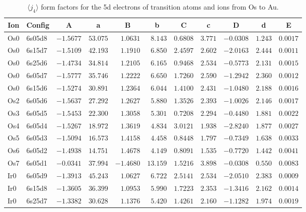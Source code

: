 \begin{table}[H]
 \caption{$\langle j_4\rangle$ form factors for the 5d electrons of transition atoms and ions from Os to Au.\cite{kob:11}}
\label{5dj4b} \vspace{1ex}
{\tablesize
\begin{tabular}{llrrrrrrrrr}
\hline
\multicolumn{1}{c}{ Ion}&\multicolumn{1}{c}{ Config}&\multicolumn{1}{c}{ A }&\multicolumn{1}{c}{  a }&\multicolumn{1}{c}{B }&\multicolumn{1}{c}{ b }&\multicolumn{1}{c}{ C }&\multicolumn{1}{c}{ c }&\multicolumn{1}{c}{ D }&\multicolumn{1}{c}{ d }&\multicolumn{1}{c}{E }\\
\hline
Os0 & 6s05d8 &$-1.5677$ &$53.075$ &$1.0631$ &$8.143$ &$0.6808$ &$3.771$ &$-0.0308$ &$1.243$ &$0.0017$ \\
Os0 & 6s15d7 &$-1.5109$ &$42.193$ &$1.1910$ &$6.850$ &$2.4597$ &$2.602$ &$-2.0163$ &$2.444$ &$0.0011$ \\
Os0 & 6s25d6 &$-1.4734$ &$34.814$ &$1.2105$ &$6.165$ &$0.9468$ &$2.534$ &$-0.5773$ &$2.131$ &$0.0015$ \\
Os0 & 6s05d7 &$-1.5777$ &$35.746$ &$1.2222$ &$6.650$ &$1.7260$ &$2.590$ &$-1.2942$ &$2.360$ &$0.0012$ \\
Os0 & 6s15d6 &$-1.5274$ &$30.891$ &$1.2364$ &$6.044$ &$1.4100$ &$2.431$ &$-1.0480$ &$2.188$ &$0.0016$ \\
Os2 & 6s05d6 &$-1.5637$ &$27.292$ &$1.2627$ &$5.880$ &$1.3526$ &$2.393$ &$-1.0026$ &$2.146$ &$0.0017$ \\
Os3 & 6s05d5 &$-1.5453$ &$22.300$ &$1.3058$ &$5.301$ &$0.7208$ &$2.294$ &$-0.4480$ &$1.881$ &$0.0022$ \\
Os4 & 6s05d4 &$-1.5267$ &$18.972$ &$1.3619$ &$4.834$ &$3.0121$ &$1.938$ &$-2.8240$ &$1.877$ &$0.0027$ \\
Os5 & 6s05d3 &$-1.5094$ &$16.573$ &$1.4158$ &$4.458$ &$0.8448$ &$1.797$ &$-0.7349$ &$1.638$ &$0.0033$ \\
Os6 & 6s05d2 &$-1.4938$ &$14.751$ &$1.4678$ &$4.149$ &$0.8091$ &$1.535$ &$-0.7720$ &$1.442$ &$0.0041$ \\
Os7 & 6s05d1 &$-0.0341$ &$37.994$ &$-1.4680$ &$13.159$ &$1.5216$ &$3.898$ &$-0.0308$ &$0.550$ &$0.0083$ \\
Ir0 & 6s05d9 &$-1.3913$ &$45.243$ &$1.0627$ &$6.722$ &$2.5141$ &$2.534$ &$-2.0510$ &$2.383$ &$0.0009$ \\
Ir0 & 6s15d8 &$-1.3605$ &$36.399$ &$1.0953$ &$5.990$ &$1.7223$ &$2.353$ &$-1.3416$ &$2.162$ &$0.0014$ \\
Ir0 & 6s25d7 &$-1.3382$ &$30.628$ &$1.1376$ &$5.420$ &$1.4261$ &$2.160$ &$-1.1282$ &$1.974$ &$0.0019$ \\

\end{tabular}}
\end{table}
